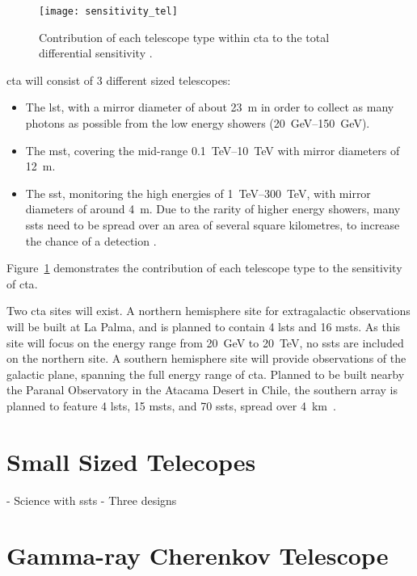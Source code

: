 \begin{figure}
	\centering\texttt{[image: sensitivity\_tel]} 
	\caption[Differential sensitivity of the different CTA telescope types.]{Contribution of each telescope type within \gls{cta} to the total differential sensitivity \cite{Marano2014}.}
	\label{fig:sensitivity_tel}
\end{figure}

\gls{cta} will consist of 3 different sized telescopes:
\begin{itemize}
\item The \gls{lst}, with a mirror diameter of about \SI{23}{m} in order to collect as many photons as possible from the low energy showers (\SIrange{20}{150}{GeV}).
\item The \gls{mst}, covering the mid-range \SIrange{0.1}{10}{TeV} with mirror diameters of \SI{12}{m}.
\item The \gls{sst}, monitoring the high energies of \SIrange{1}{300}{TeV}, with mirror diameters of around \SI{4}{m}. Due to the rarity of higher energy showers, many \glspl{sst} need to be spread over an area of several square kilometres, to increase the chance of a detection \cite{Acharya2013}.
\end{itemize}
Figure~\ref{fig:sensitivity_tel} demonstrates the contribution of each telescope type to the sensitivity of \gls{cta}.

Two \gls{cta} sites will exist. A northern hemisphere site for extragalactic observations will be built at La Palma, and is planned to contain 4 \glspl{lst} and 16 \glspl{mst}. As this site will focus on the energy range from \SI{20}{GeV} to \SI{20}{TeV}, no \glspl{sst} are included on the northern site. A southern hemisphere site will provide observations of the galactic plane, spanning the full energy range of \gls{cta}. Planned to be built nearby the Paranal Observatory in the Atacama Desert in Chile, the southern array is planned to feature 4 \glspl{lst}, 15 \glspl{mst}, and 70 \glspl{sst}, spread over \SI{4}{km \squared}.

\section{Small Sized Telecopes}

- Science with ssts
- Three designs

\section{Gamma-ray Cherenkov Telescope}

